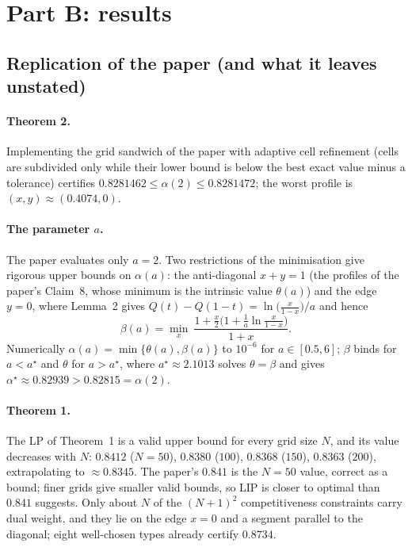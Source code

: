 
\section{Part B: results}

\subsection{Replication of the paper (and what it leaves unstated)}

\paragraph{Theorem 2.} Implementing the grid sandwich of the paper with adaptive cell refinement
(cells are subdivided only while their lower bound is below the best exact value minus a tolerance)
certifies $0.8281462\le\alpha(2)\le0.8281472$; the worst profile is $(x,y)\approx(0.4074,0)$.

\paragraph{The parameter $a$.} The paper evaluates only $a=2$. Two restrictions of the minimisation give
rigorous upper bounds on $\alpha(a)$: the anti-diagonal $x+y=1$ (the profiles of the paper's Claim~8,
whose minimum is the intrinsic value $\theta(a)$) and the edge $y=0$, where Lemma~2 gives
$Q(t)-Q(1-t)=\ln\!\big(\tfrac{x}{1-x}\big)/a$ and hence
\[
\beta(a)=\min_{x}\ \frac{1+\tfrac{x}{2}\big(1+\tfrac1a\ln\tfrac{x}{1-x}\big)}{1+x}.
\]
Numerically $\alpha(a)=\min\{\theta(a),\beta(a)\}$ to $10^{-6}$ for $a\in[0.5,6]$; $\beta$ binds for
$a<a^\star$ and $\theta$ for $a>a^\star$, where $a^\star\approx2.1013$ solves $\theta=\beta$ and gives
$\alpha^\star\approx0.82939>0.82815=\alpha(2)$.

\paragraph{Theorem 1.} The LP of Theorem~1 is a valid upper bound for every grid size $N$, and its
value decreases with $N$: $0.8412$ ($N=50$), $0.8380$ ($100$), $0.8368$ ($150$), $0.8363$ ($200$), extrapolating to
$\approx0.8345$. The paper's $0.841$ is the $N=50$ value, correct as a bound; finer grids give
smaller valid bounds, so LIP is closer to optimal than $0.841$ suggests. Only about $N$ of the $(N+1)^2$ competitiveness constraints carry dual weight, and they lie on
the edge $x=0$ and a segment parallel to the diagonal; eight well-chosen types already certify $0.8734$.

